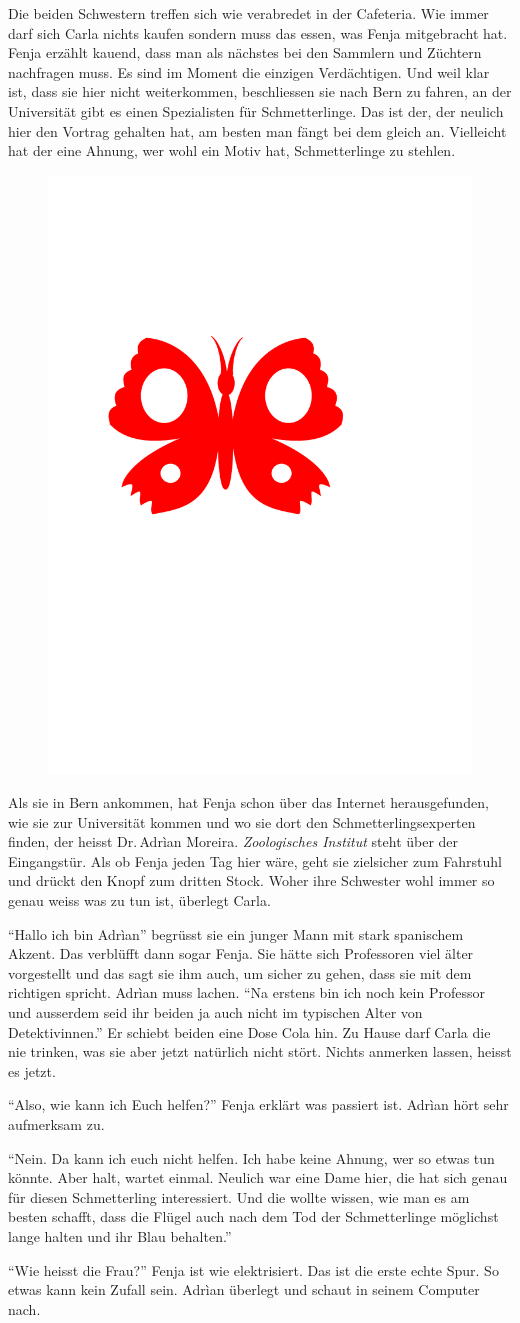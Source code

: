 Die beiden Schwestern treffen sich wie verabredet in der Cafeteria. Wie immer darf sich Carla nichts kaufen sondern muss das essen, was Fenja mitgebracht hat. Fenja erzählt kauend, dass man als nächstes bei den Sammlern und Züchtern nachfragen muss. Es sind im Moment die einzigen Verdächtigen. Und weil klar ist, dass sie hier nicht weiterkommen, beschliessen sie nach Bern zu fahren, an der Universität gibt es einen Spezialisten für Schmetterlinge. Das ist der, der neulich hier den Vortrag gehalten hat, am besten man fängt bei dem gleich an. Vielleicht hat der eine Ahnung, wer wohl ein Motiv hat, Schmetterlinge zu stehlen.
\begin{figure}[H]
\centering
\includegraphics[width=.05\textwidth]{bilder/inkling.pdf}
\end{figure}
Als sie in Bern ankommen, hat Fenja schon über das Internet herausgefunden, wie sie zur Universität kommen und wo sie dort den Schmetterlingsexperten finden, der heisst Dr.\,Adrìan Moreira. \emph{Zoologisches Institut} steht über der Eingangstür. Als ob Fenja jeden Tag hier wäre, geht sie zielsicher zum Fahrstuhl und drückt den Knopf zum dritten Stock. Woher ihre Schwester wohl immer so genau weiss was zu tun ist, überlegt Carla.

\enquote{Hallo ich bin Adrìan} begrüsst sie ein junger Mann mit stark spanischem Akzent. Das verblüfft dann sogar Fenja. Sie hätte sich Professoren viel älter vorgestellt und das sagt sie ihm auch, um sicher zu gehen, dass sie mit dem richtigen spricht. Adrìan muss lachen. \enquote{Na erstens bin ich noch kein Professor und ausserdem seid ihr beiden ja auch nicht im typischen Alter von Detektivinnen.} Er schiebt beiden eine Dose Cola hin. Zu Hause darf Carla die nie trinken, was sie aber jetzt natürlich nicht stört. Nichts anmerken lassen, heisst es jetzt.

\enquote{Also, wie kann ich Euch helfen?} Fenja erklärt was passiert ist. Adrìan hört sehr aufmerksam zu.

\enquote{Nein. Da kann ich euch nicht helfen. Ich habe keine Ahnung, wer so etwas tun könnte. Aber halt, wartet einmal. Neulich war eine Dame hier, die hat sich genau für diesen Schmetterling interessiert. Und die wollte wissen, wie man es am besten schafft, dass die Flügel auch nach dem Tod der Schmetterlinge möglichst lange halten und ihr Blau behalten.}

\enquote{Wie heisst die Frau?} Fenja ist wie elektrisiert. Das ist die erste echte Spur. So etwas kann kein Zufall sein. Adrìan überlegt und schaut in seinem Computer nach.

